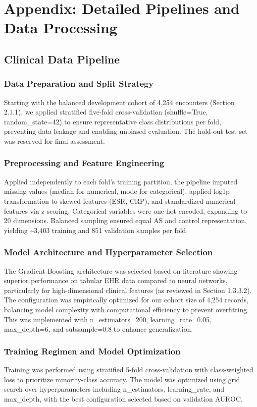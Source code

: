 \documentclass[12pt, a4paper]{article}
\begin{document}
\section{Appendix: Detailed Pipelines and Data Processing}

\subsection{Clinical Data Pipeline}

\subsubsection{Data Preparation and Split Strategy}
Starting with the balanced development cohort of 4,254 encounters (Section 2.1.1), we applied stratified five-fold cross-validation (shuffle=True, random\_state=42) to ensure representative class distributions per fold, preventing data leakage and enabling unbiased evaluation. The hold-out test set was reserved for final assessment.

\subsubsection{Preprocessing and Feature Engineering}
Applied independently to each fold's training partition, the pipeline imputed missing values (median for numerical, mode for categorical), applied log1p transformation to skewed features (ESR, CRP), and standardized numerical features via z-scoring. Categorical variables were one-hot encoded, expanding to 20 dimensions. Balanced sampling ensured equal AS and control representation, yielding \textasciitilde3,403 training and 851 validation samples per fold.

\subsubsection{Model Architecture and Hyperparameter Selection}
The Gradient Boosting architecture was selected based on literature showing superior performance on tabular EHR data compared to neural networks, particularly for high-dimensional clinical features (as reviewed in Section 1.3.3.2). The configuration was empirically optimized for our cohort size of 4,254 records, balancing model complexity with computational efficiency to prevent overfitting. This was implemented with n\_estimators=200, learning\_rate=0.05, max\_depth=6, and subsample=0.8 to enhance generalization.

\subsubsection{Training Regimen and Model Optimization}
Training was performed using stratified 5-fold cross-validation with class-weighted loss to prioritize minority-class accuracy. The model was optimized using grid search over hyperparameters including n\_estimators, learning\_rate, and max\_depth, with the best configuration selected based on validation AUROC.
\end{document}
